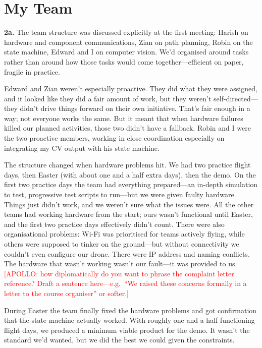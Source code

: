 \section{My Team}

\textbf{2a.}
The team structure was discussed explicitly at the first meeting: Harish on hardware and component communications, Zian on path planning, Robin on the state machine, Edward and I on computer vision. We'd organised around tasks rather than around how those tasks would come together---efficient on paper, fragile in practice.

Edward and Zian weren't especially proactive. They did what they were assigned, and it looked like they did a fair amount of work, but they weren't self-directed---they didn't drive things forward on their own initiative. That's fair enough in a way; not everyone works the same. But it meant that when hardware failures killed our planned activities, those two didn't have a fallback. Robin and I were the two proactive members, working in close coordination especially on integrating my CV output with his state machine.

The structure changed when hardware problems hit. We had two practice flight days, then Easter (with about one and a half extra days), then the demo. On the first two practice days the team had everything prepared---an in-depth simulation to test, progressive test scripts to run---but we were given faulty hardware. Things just didn't work, and we weren't sure what the issues were. All the other teams had working hardware from the start; ours wasn't functional until Easter, and the first two practice days effectively didn't count. There were also organisational problems: Wi-Fi was prioritised for teams actively flying, while others were supposed to tinker on the ground---but without connectivity we couldn't even configure our drone. There were IP address and naming conflicts. The hardware that wasn't working wasn't our fault---it was provided to us. \textcolor{red}{[APOLLO: how diplomatically do you want to phrase the complaint letter reference? Draft a sentence here---e.g.\ ``We raised these concerns formally in a letter to the course organiser'' or softer.]}

During Easter the team finally fixed the hardware problems and got confirmation that the state machine actually worked. With roughly one and a half functioning flight days, we produced a minimum viable product for the demo. It wasn't the standard we'd wanted, but we did the best we could given the constraints.

